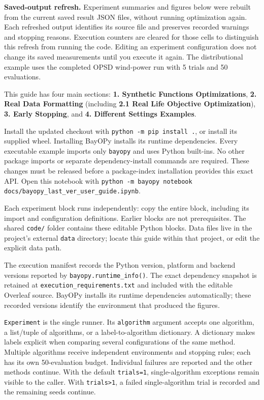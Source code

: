 \documentclass[10pt,a4paper]{article}
\begin{document}
\textbf{Saved-output refresh.} Experiment summaries and figures below were rebuilt from the current saved result JSON files,\allowbreak{} without running optimization again. Each refreshed output identifies its source file and preserves recorded warnings and stopping reasons. Execution counters are cleared for those cells to distinguish this refresh from running the code. Editing an experiment configuration does not change its saved measurements until you execute it again. The distributional example uses the completed OPSD wind-power run with 5 trials and 50 evaluations.


This guide has four main sections: \textbf{1. Synthetic Functions Optimizations},\allowbreak{} \textbf{2. Real Data Formatting} (including \textbf{2.1 Real Life Objective Optimization}),\allowbreak{} \textbf{3. Early Stopping},\allowbreak{} and \textbf{4. Different Settings Examples}.


Install the updated checkout with \texttt{python -m pip install .\allowbreak{}},\allowbreak{} or install its supplied wheel. Installing BayOPy installs its runtime dependencies. Every executable example imports only \texttt{bayopy} and uses Python built-ins. No other package imports or separate dependency-install commands are required. These changes must be released before a package-index installation provides this exact API. Open this notebook with \texttt{python -m bayopy notebook docs/\allowbreak{}bayopy\_\allowbreak{}last\_\allowbreak{}ver\_\allowbreak{}user\_\allowbreak{}guide.\allowbreak{}ipynb}.


Each experiment block runs independently: copy the entire block,\allowbreak{} including its import and configuration definitions. Earlier blocks are not prerequisites. The shared \texttt{code/} folder contains these editable Python blocks. Data files live in the project's external \texttt{data} directory; locate this guide within that project,\allowbreak{} or edit the explicit data path.


The execution manifest records the Python version,\allowbreak{} platform and backend versions reported by \texttt{bayopy.\allowbreak{}runtime\_\allowbreak{}info()}. The exact dependency snapshot is retained at \texttt{execution\_\allowbreak{}requirements.\allowbreak{}txt} and included with the editable Overleaf source. BayOPy installs its runtime dependencies automatically; these recorded versions identify the environment that produced the figures.


\texttt{Experiment} is the single runner. Its \texttt{algorithm} argument accepts one algorithm,\allowbreak{} a list/tuple of algorithms,\allowbreak{} or a label-to-algorithm dictionary. A dictionary makes labels explicit when comparing several configurations of the same method. Multiple algorithms receive independent environments and stopping rules; each has its own 50-evaluation budget. Individual failures are reported and the other methods continue. With the default \texttt{trials=\allowbreak{}1},\allowbreak{} single-algorithm exceptions remain visible to the caller. With \texttt{trials>1},\allowbreak{} a failed single-algorithm trial is recorded and the remaining seeds continue.
\end{document}

